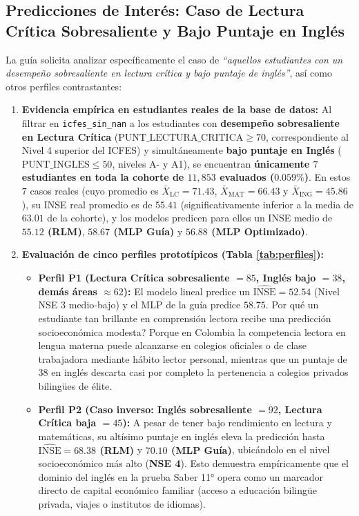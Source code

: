 \documentclass[11pt,letterpaper]{article}
\begin{document}
\subsection{Predicciones de Interés: Caso de Lectura Crítica Sobresaliente y Bajo Puntaje en Inglés}
La guía solicita analizar específicamente el caso de \textit{``aquellos estudiantes con un desempeño sobresaliente en lectura crítica y bajo puntaje de inglés''}, así como otros perfiles contrastantes:
\begin{enumerate}
    \item \textbf{Evidencia empírica en estudiantes reales de la base de datos:} Al filtrar en \texttt{icfes\_sin\_nan} a los estudiantes con \textbf{desempeño sobresaliente en Lectura Crítica} ($\text{PUNT\_LECTURA\_CRITICA} \ge 70$, correspondiente al Nivel 4 superior del ICFES) y simultáneamente \textbf{bajo puntaje en Inglés} ($\text{PUNT\_INGLES} \le 50$, niveles A- y A1), se encuentran \textbf{únicamente $7$ estudiantes en toda la cohorte de $11,853$ evaluados ($0.059\%$)}. En estos $7$ casos reales (cuyo promedio es $\bar{X}_{\text{LC}} = 71.43$, $\bar{X}_{\text{MAT}} = 66.43$ y $\bar{X}_{\text{ING}} = 45.86$), su INSE real promedio es de \textbf{$55.41$} (significativamente inferior a la media de $63.01$ de la cohorte), y los modelos predicen para ellos un INSE medio de \textbf{$55.12$ (RLM)}, \textbf{$58.67$ (MLP Guía)} y \textbf{$56.88$ (MLP Optimizado)}.
    \item \textbf{Evaluación de cinco perfiles prototípicos (Tabla \ref{tab:perfiles}):}
    \begin{itemize}
        \item \textbf{Perfil P1 (Lectura Crítica sobresaliente $= 85$, Inglés bajo $= 38$, demás áreas $\approx 62$):} El modelo lineal predice un $\widehat{\text{INSE}} = 52.54$ (Nivel NSE 3 medio-bajo) y el MLP de la guía predice $58.75$. \textquestiondown Por qué un estudiante tan brillante en comprensión lectora recibe una predicción socioeconómica modesta? Porque en Colombia la competencia lectora en lengua materna puede alcanzarse en colegios oficiales o de clase trabajadora mediante hábito lector personal, mientras que un puntaje de $38$ en inglés descarta casi por completo la pertenencia a colegios privados bilingües de élite.
        \item \textbf{Perfil P2 (Caso inverso: Inglés sobresaliente $= 92$, Lectura Crítica baja $= 45$):} A pesar de tener bajo rendimiento en lectura y matemáticas, su altísimo puntaje en inglés eleva la predicción hasta \textbf{$\widehat{\text{INSE}} = 68.38$ (RLM)} y \textbf{$70.10$ (MLP Guía)}, ubicándolo en el nivel socioeconómico más alto (\textbf{NSE 4}). Esto demuestra empíricamente que el dominio del inglés en la prueba Saber 11° opera como un marcador directo de capital económico familiar (acceso a educación bilingüe privada, viajes o institutos de idiomas).

\end{itemize}
\end{enumerate}
\end{document}
